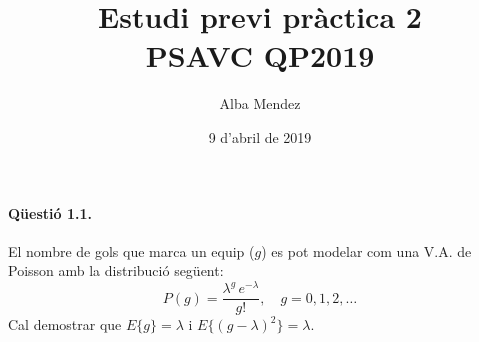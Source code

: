 \documentclass[catalan]{scrartcl}
\author{Alba Mendez}
\title{Estudi previ pràctica 2\\
{\small PSAVC QP2019}}
\date{9 d'abril de 2019}
\begin{document}
\maketitle

\paragraph{Qüestió 1.1.}

El nombre de gols que marca un equip ($g$) es pot modelar com una V.A. de
Poisson amb la distribució següent:
%
\begin{equation}
  P(g) = \frac{\lambda^g \, e^{-\lambda} }{g!}, \quad g = 0,1,2,\hdots
\end{equation}
%
Cal demostrar que $E\{g\} = \lambda$ i $E\{(g - \lambda)^2\} = \lambda$.
\end{document}

